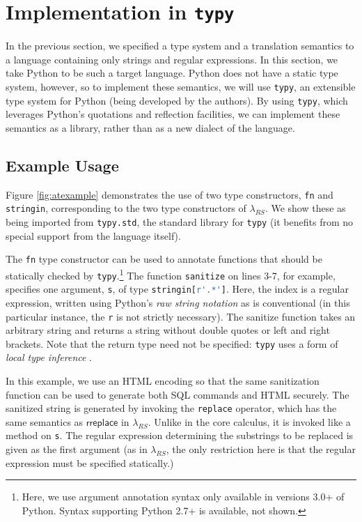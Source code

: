 \documentclass[10pt]{sigplanconf}
\theoremstyle{definition}
\begin{document}
\section{Implementation in \tt{typy}}\label{typy}
In the previous section, we specified a type system and a translation semantics to a language containing only strings and regular expressions. In this section, we take Python to be such a target language. Python does not have a static type system, however, so to implement these semantics, we will use \verb|typy|, an extensible type system for Python (being developed by the authors). By using \verb|typy|, which leverages Python's quotations and reflection facilities, we can implement these semantics as a library, rather than as a new dialect of the language. 

\subsection{Example Usage}

\newcommand{\lstinlinep}[1]{\lstinline[language=Python,basicstyle=\ttfamily\footnotesize]{#1}}

Figure \ref{fig:atexample} demonstrates the use of two type constructors, \verb|fn| and \verb|stringin|, corresponding to the two type constructors of $\lambda_{RS}$. We show these as being imported from \verb|typy.std|, the standard library for \verb|typy| (it benefits from no special support from the language itself). 

The \verb|fn| type constructor can be used to annotate functions that should be statically checked by \verb|typy|.\footnote{Here, we use argument annotation syntax only available in versions 3.0+ of Python. Syntax supporting Python 2.7+ is available, not shown.} The function \verb|sanitize| on lines 3-7, for example,  specifies one argument, \verb|s|, of type \lstinlinep{stringin[r'.*']}. Here, the index is a regular expression, written using Python's \emph{raw string notation} as is conventional (in this particular instance, the \verb|r| is not strictly necessary). The sanitize function takes an arbitrary string and returns a string without
double quotes or left and right brackets. Note that the return type need not be specified: \verb|typy| uses a form of \emph{local type inference} \cite{Pierce:2000:LTI:345099.345100}. 

In this example, we use an HTML encoding so that the same sanitization function can be used to generate both SQL commands and HTML securely. The sanitized string is generated by invoking the \verb|replace| operator, which has the same semantics as $\textsf{rreplace}$ in $\lambda_{RS}$. Unlike in the core calculus, it is invoked like a method on \verb|s|. The regular expression determining the substrings to be replaced is given as the first argument (as in $\lambda_{RS}$, the only restriction here is that the regular expression must be specified statically.)
\end{document}
